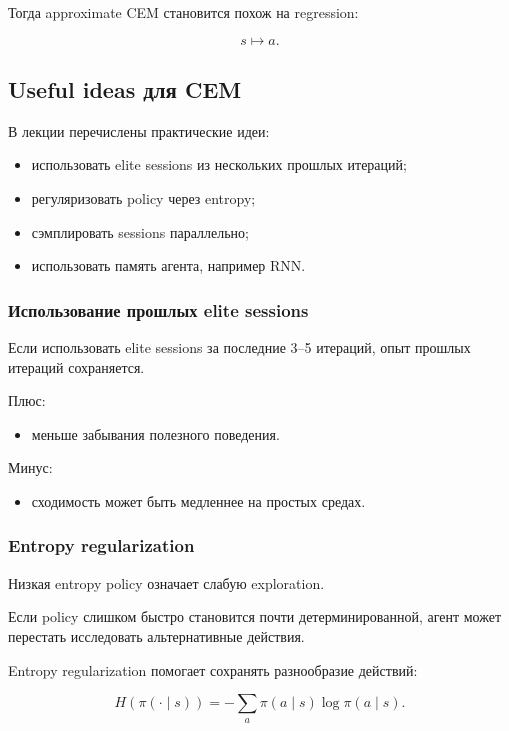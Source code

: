 \documentclass[a4paper,12pt]{article}
\begin{document}
Тогда approximate CEM становится похож на regression:

\[
s \mapsto a.
\]

\subsection{Useful ideas для CEM}

В лекции перечислены практические идеи:

\begin{itemize}
    \item использовать elite sessions из нескольких прошлых итераций;
    \item регуляризовать policy через entropy;
    \item сэмплировать sessions параллельно;
    \item использовать память агента, например RNN.
\end{itemize}

\subsubsection{Использование прошлых elite sessions}

Если использовать elite sessions за последние 3--5 итераций, опыт прошлых итераций сохраняется.

Плюс:

\begin{itemize}
    \item меньше забывания полезного поведения.
\end{itemize}

Минус:

\begin{itemize}
    \item сходимость может быть медленнее на простых средах.
\end{itemize}

\subsubsection{Entropy regularization}

Низкая entropy policy означает слабую exploration.

Если policy слишком быстро становится почти детерминированной, агент может перестать исследовать альтернативные действия.

Entropy regularization помогает сохранять разнообразие действий:

\[
H(\pi(\cdot \mid s))
=
-
\sum_a
\pi(a \mid s)\log \pi(a \mid s).
\]
\end{document}
